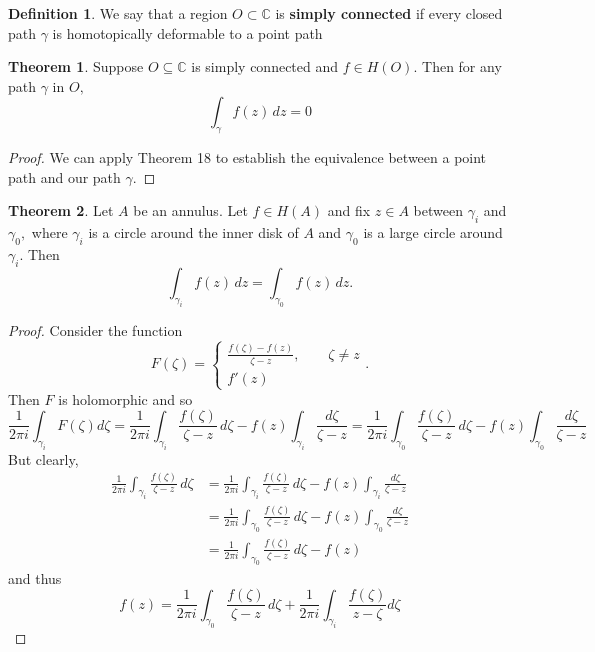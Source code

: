 \documentclass[10pt, oneside]{article}
\newcommand{\bbC}{\mathbb{C}}
\theoremstyle{definition}
\newtheorem{thm}{Theorem}
\newtheorem{defn}{Definition}
\newcommand{\bbC}{\mathbb{C}}
\begin{document}
\begin{defn}
    We say that a region $O \subset \bbC$ is \textbf{simply connected} if every closed path $\gamma$ is homotopically  deformable to a point path
\end{defn}

\begin{thm}
    Suppose $O\subseteq \bbC$ is simply connected and $f\in H(O).$ Then for any path $\gamma$ in $O,$ 
    \[\int_\gamma f(z)\, dz = 0\]
\end{thm}
\begin{proof}
    We can apply Theorem 18 to establish the equivalence between a point path and our path $\gamma.$
\end{proof}

\begin{thm}
    Let $A$ be an annulus. Let $f \in H(A)$ and fix $z\in A$ between $\gamma_i$ and $\gamma_0,$ where $\gamma_i$ is a circle around the inner disk of $A$ and $\gamma_0$ is a large circle around $\gamma_i.$ Then 
    \[\int_{\gamma_i}f(z)\, dz = \int_{\gamma_0}f(z)\, dz.\]
\end{thm}
\begin{proof}
    Consider the function 
    \[F(\zeta) = \begin{cases}
        \frac{f(\zeta) - f(z)}{\zeta - z}, \qquad \zeta \neq z\\
        f'(z)
    \end{cases}.\] Then $F$ is holomorphic and so 
    \[\frac{1}{2\pi i}\int_{\gamma_i}F(\zeta)d\zeta = \frac{1}{2\pi i}\int_{\gamma_i}\frac{f(\zeta)}{\zeta - z}\,d\zeta - f(z) \int_{\gamma_i} \frac{d\zeta}{\zeta - z} = \frac{1}{2\pi i}\int_{\gamma_0}\frac{f(\zeta)}{\zeta - z}\,d\zeta - f(z) \int_{\gamma_0} \frac{d\zeta}{\zeta - z}\] But clearly, 
    \begin{align*}
        \frac{1}{2\pi i}\int_{\gamma_i}\frac{f(\zeta)}{\zeta - z}\,d\zeta &= \frac{1}{2\pi i}\int_{\gamma_i}\frac{f(\zeta)}{\zeta - z}\,d\zeta - f(z) \int_{\gamma_i} \frac{d\zeta}{\zeta - z}\\ &= \frac{1}{2\pi i}\int_{\gamma_0}\frac{f(\zeta)}{\zeta - z}\,d\zeta - f(z) \int_{\gamma_0} \frac{d\zeta}{\zeta - z}\\
        &= \frac{1}{2\pi i}\int_{\gamma_0}\frac{f(\zeta)}{\zeta - z}\,d\zeta - f(z) 
    \end{align*} and thus 
    \[f(z) = \frac{1}{2\pi i}\int_{\gamma_0} \frac{f(\zeta)}{\zeta - z}\, d\zeta + \frac{1}{2\pi i}\int_{\gamma_i} \frac{f(\zeta)}{z - \zeta}d\zeta\]
\end{proof}
\end{document}
